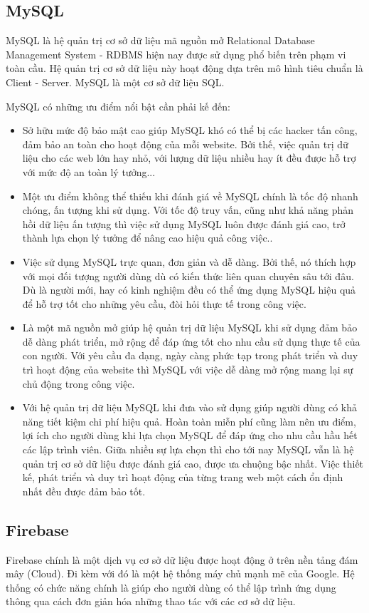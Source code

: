 \documentclass[../DoAn.tex]{subfiles}
\begin{document}
\subsection{MySQL}
MySQL\cite{mysql} là hệ quản trị cơ sở dữ liệu mã nguồn mở Relational Database Management System - RDBMS hiện nay được sử dụng phổ biến trên phạm vi toàn cầu. Hệ quản trị cơ sở dữ liệu này hoạt động dựa trên mô hình tiêu chuẩn là Client - Server. MySQL là một cơ sở dữ liệu SQL.

MySQL có những ưu điểm nổi bật cần phải kế đến:
\begin{itemize}
    \item Sở hữu mức độ bảo mật cao giúp MySQL khó có thể bị các hacker tấn công, đảm bảo an toàn cho hoạt động của mỗi website. Bởi thế, việc quản trị dữ liệu cho các web lớn hay nhỏ, với lượng dữ liệu nhiều hay ít đều được hỗ trợ với mức độ an toàn lý tưởng...
    \item Một ưu điểm không thể thiếu khi đánh giá về MySQL chính là tốc độ nhanh chóng, ấn tượng khi sử dụng. Với tốc độ truy vấn, cũng như khả năng phản hồi dữ liệu ấn tượng thì việc sử dụng MySQL luôn được đánh giá cao, trở thành lựa chọn lý tưởng để nâng cao hiệu quả công việc..
    \item Việc sử dụng MySQL trực quan, đơn giản và dễ dàng. Bởi thế, nó thích hợp với mọi đối tượng người dùng dù có kiến thức liên quan chuyên sâu tới đâu. Dù là người mới, hay có kinh nghiệm đều có thể ứng dụng MySQL hiệu quả để hỗ trợ tốt cho những yêu cầu, đòi hỏi thực tế trong công việc.
    \item Là một mã nguồn mở giúp hệ quản trị dữ liệu MySQL khi sử dụng đảm bảo dễ dàng phát triển, mở rộng để đáp ứng tốt cho nhu cầu sử dụng thực tế của con người. Với yêu cầu đa dạng, ngày càng phức tạp trong phát triển và duy trì hoạt động của website thì MySQL với việc dễ dàng mở rộng mang lại sự chủ động trong công việc.
    \item Với hệ quản trị dữ liệu MySQL khi đưa vào sử dụng giúp người dùng có khả năng tiết kiệm chi phí hiệu quả. Hoàn toàn miễn phí cũng làm nên ưu điểm, lợi ích cho người dùng khi lựa chọn MySQL để đáp ứng cho nhu cầu hầu hết các lập trình viên. Giữa nhiều sự lựa chọn thì cho tới nay MySQL vẫn là hệ quản trị cơ sở dữ liệu được đánh giá cao, được ưa chuộng bậc nhất. Việc thiết kế, phát triển và duy trì hoạt động của từng trang web một cách ổn định nhất đều được đảm bảo tốt.
\end{itemize}
\subsection{Firebase}
Firebase\cite{firebase} chính là một dịch vụ cơ sở dữ liệu được hoạt động ở trên nền tảng đám mây (Cloud). Đi kèm với đó là một hệ thống máy chủ mạnh mẽ của Google. Hệ thống có chức năng chính là giúp cho người dùng có thể lập trình ứng dụng thông qua cách đơn giản hóa những thao tác với các cơ sở dữ liệu. 
\end{document}
